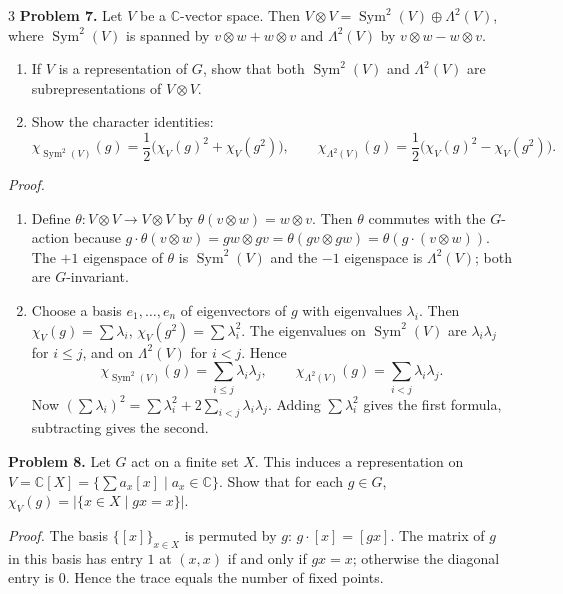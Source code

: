 \documentclass[10pt,landscape]{article}
\begin{document}
\begin{multicols}{3}
\noindent\textbf{Problem 7.} Let \(V\) be a \(\mathbb{C}\)-vector space. Then \(V\otimes V = \operatorname{Sym}^2(V)\oplus\Lambda^2(V)\), where \(\operatorname{Sym}^2(V)\) is spanned by \(v\otimes w+w\otimes v\) and \(\Lambda^2(V)\) by \(v\otimes w-w\otimes v\).

\begin{enumerate}
\item If \(V\) is a representation of \(G\), show that both \(\operatorname{Sym}^2(V)\) and \(\Lambda^2(V)\) are subrepresentations of \(V\otimes V\).
\item Show the character identities:
\[
\chi_{\operatorname{Sym}^2(V)}(g)=\frac12\bigl(\chi_V(g)^2+\chi_V(g^2)\bigr),\qquad
\chi_{\Lambda^2(V)}(g)=\frac12\bigl(\chi_V(g)^2-\chi_V(g^2)\bigr).
\]
\end{enumerate}

\textit{Proof.}
\begin{enumerate}
\item Define \(\theta:V\otimes V\to V\otimes V\) by \(\theta(v\otimes w)=w\otimes v\). Then \(\theta\) commutes with the \(G\)-action because \(g\cdot\theta(v\otimes w)=gw\otimes gv=\theta(gv\otimes gw)=\theta(g\cdot(v\otimes w))\). The \(+1\) eigenspace of \(\theta\) is \(\operatorname{Sym}^2(V)\) and the \(-1\) eigenspace is \(\Lambda^2(V)\); both are \(G\)-invariant.
\item Choose a basis \(e_1,\dots,e_n\) of eigenvectors of \(g\) with eigenvalues \(\lambda_i\). Then \(\chi_V(g)=\sum\lambda_i\), \(\chi_V(g^2)=\sum\lambda_i^2\). The eigenvalues on \(\operatorname{Sym}^2(V)\) are \(\lambda_i\lambda_j\) for \(i\le j\), and on \(\Lambda^2(V)\) for \(i<j\). Hence
\[
\chi_{\operatorname{Sym}^2(V)}(g)=\sum_{i\le j}\lambda_i\lambda_j,\qquad
\chi_{\Lambda^2(V)}(g)=\sum_{i<j}\lambda_i\lambda_j.
\]
Now \((\sum\lambda_i)^2=\sum\lambda_i^2+2\sum_{i<j}\lambda_i\lambda_j\). Adding \(\sum\lambda_i^2\) gives the first formula, subtracting gives the second.
\end{enumerate}

\noindent\textbf{Problem 8.} Let \(G\) act on a finite set \(X\). This induces a representation on \(V=\mathbb{C}[X]=\{\sum a_x[x]\mid a_x\in\mathbb{C}\}\). Show that for each \(g\in G\), \(\chi_V(g)=|\{x\in X\mid gx=x\}|\).

\textit{Proof.} The basis \(\{ [x]\}_{x\in X}\) is permuted by \(g\): \(g\cdot[x]=[gx]\). The matrix of \(g\) in this basis has entry \(1\) at \((x,x)\) if and only if \(gx=x\); otherwise the diagonal entry is \(0\). Hence the trace equals the number of fixed points.


\end{multicols}
\end{document}
